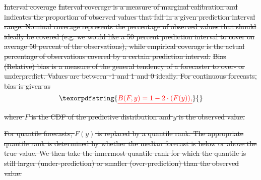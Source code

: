 \documentclass[10pt,letterpaper]{article}
\providecommand{\DIFdeltex}[1]{{\protect\color{red}\sout{#1}}}                      %
\providecommand{\DIFdel}[1]{\texorpdfstring{\DIFdeltex{#1}}{}} %
\begin{document}
\DIFdel{Interval coverage }%
\DIFdel{Interval coverage is a measure of marginal calibration and indicates the proportion of observed values that fall in a given prediction interval range. Nominal coverage represents the percentage of observed values that should ideally be covered (e.g. we would like a 50 percent prediction interval to cover on average 50 percent of the observations), while empirical coverage is the actual percentage of observations covered by a certain prediction interval.}%
\DIFdel{Bias }%
\DIFdel{(Relative) bias is a measure of the general tendency of a forecaster to over- or underpredict. Values are between -1 and 1 and 0 ideally. For continuous forecasts, bias is given as 
}\begin{displaymath}\DIFdel{B(F, y) = 1 - 2 \cdot (F (y)), }\end{displaymath}%
\DIFdel{where $F$ is the CDF of the predictive distribution and $y$ is the observed value. 
}%

\DIFdel{For quantile forecasts, $F(y)$ is replaced by a quantile rank. The appropriate quantile rank is determined by whether the median forecast is below  or above the true value. We then take the innermost quantile rank for which the quantile is still larger (under-prediction) or smaller (over-prediction) than the observed value. 
}%



\end{document}

